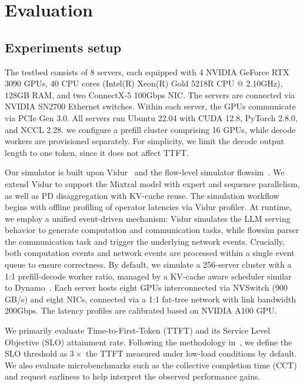 \section{Evaluation}
\label{sec:evaluation}

\subsection{Experiments setup}

The testbed consists of 8 servers, each equipped with 4 NVIDIA GeForce RTX 3090 GPUs, 40 CPU cores (Intel(R) Xeon(R) Gold 5218R CPU @ 2.10GHz), 128GB RAM, and two ConnectX-5 100Gbps NIC. The servers are connected via NVIDIA SN2700 Ethernet switches. Within each server, the GPUs communicate via PCIe Gen 3.0. All servers run Ubuntu 22.04 with CUDA 12.8, PyTorch 2.8.0, and NCCL 2.28. we configure a prefill cluster comprising 16 GPUs, while decode workers are provisioned separately. For simplicity, we limit the decode output length to one token, since it does not affect TTFT.

Our simulator is built upon Vidur~\cite{agrawal2024vidur} and the flow-level simulator flowsim~\cite{FlowSim2024}. We extend Vidur to support the Mixtral model with expert and sequence parallelism, as well as PD disaggregation with KV-cache reuse. The simulation workflow begins with offline profiling of operator latencies via Vidur profiler. At runtime, we employ a unified event-driven mechanism: Vidur simulates the LLM serving behavior to generate computation and communication tasks, while flowsim parser the communication task and trigger the underlying network events. Crucially, both computation events and network events are processed within a single event queue to ensure correctness. By default, we simulate a 256-server cluster with a 1:1 prefill-decode worker ratio, managed by a KV-cache aware scheduler similar to Dynamo~\cite{NVIDIA_Dynamo}.  Each server hosts eight GPUs interconnected via NVSwitch (900 GB/s) and eight NICs, connected via a 1:1 fat-tree network with link bandwidth 200Gbps. The latency profiles are calibrated based on NVIDIA A100 GPU.

We primarily evaluate Time-to-First-Token (TTFT) and its Service Level Objective (SLO) attainment rate. Following the methodology in~\cite{patke2024queue,hongsola,stojkovic2025dynamollm}, we define the SLO threshold as $3\times$ the TTFT measured under low-load conditions by default. We also evaluate microbenchmarks such as the collective completion time (CCT) and request earliness to help interpret the observed performance gains.

